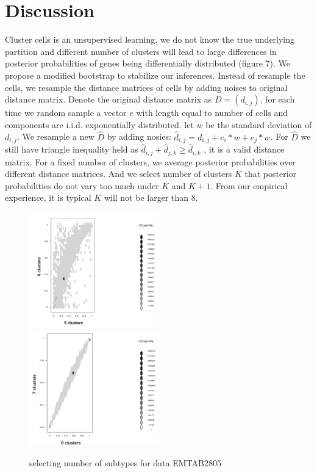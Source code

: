 \documentclass[11pt]{amsart}
\begin{document}
\section{Discussion}
Cluster cells is an unsupervised learning, we do not know the true underlying partition and different number of clusters will lead to large differences in posterior probabilities of genes being differentially distributed (figure 7). We propose a modified bootstrap to stabilize our inferences. Instead of resample the cells, we resample the distance matrices of cells by adding noises to original distance matrix. Denote the original distance matrix as $D = (d_{i,j})$, for each time we random sample a vector $e$ with length equal to number of cells and components are i.i.d. exponentially distributed. let $w$ be the standard deviation of $d_{i,j}$. We resample a new $\hat{D}$ by adding nosies: $\hat{d}_{i,j} = d_{i,j} + e_i * w + e_j *w$. For $\hat{D}$ we still have triangle inequality held as $\hat{d}_{i,j} + \hat{d}_{j,k} \geq \hat{d}_{i,k}$ , it is a valid distance matrix. For a fixed number of clusters, we average posterior probabilities over different distance matrices. And we select number of clusters $K$ that posterior probabilities do not vary too much under $K$ and $K+1$. From our empirical experience, it is typical $K$ will not be larger than 8.\\
\begin{figure}[H]
  \includegraphics[height = 5cm, width=\linewidth]{E28_56.png}
\endminipage\hfill
{}
  \includegraphics[height = 5cm, width=\linewidth]{E28_67.png}
\endminipage\hfill
\caption{selecting number of subtypes for data EMTAB2805}
\end{figure}
\end{document}

